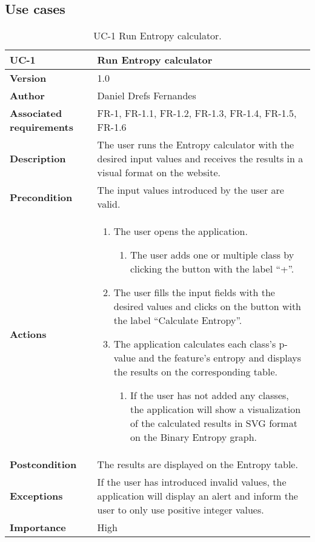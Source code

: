 \subsection{Use cases}
\begin{table}[p]
	\centering
	\begin{tabularx}{\linewidth}{ p{} p{} }
		\toprule
		\textbf{UC-1}    & \textbf{Run Entropy calculator}\\
		\toprule
		\textbf{Version}              & 1.0    \\
		\textbf{Author}                & Daniel Drefs Fernandes \\
		\textbf{Associated requirements} & FR-1, FR-1.1, FR-1.2, FR-1.3, FR-1.4, FR-1.5, FR-1.6 \\
		\textbf{Description}          & The user runs the Entropy calculator with the desired input values and receives the results in a visual format on the website. \\
		\textbf{Precondition}         & The input values introduced by the user are valid. \\
		\textbf{Actions}             &
		\begin{enumerate}
			\def\labelenumi{\arabic{enumi}.}
			\tightlist
			\item The user opens the application.
            \begin{enumerate}
                \item The user adds one or multiple class by clicking the button with the label ``+''.
            \end{enumerate}
			\item The user fills the input fields with the desired values and clicks on the button with the label ``Calculate Entropy''.
            \item The application calculates each class's p-value and the feature's entropy and displays the results on the corresponding table.
            \begin{enumerate}
                \item If the user has not added any classes, the application will show a visualization of the calculated results in SVG format on the Binary Entropy graph.
            \end{enumerate}
		\end{enumerate}\\
		\textbf{Postcondition}        & The results are displayed on the Entropy table. \\
		\textbf{Exceptions}          & If the user has introduced invalid values, the application will display an alert and inform the user to only use positive integer values. \\
		\textbf{Importance}          & High \\
		\bottomrule
	\end{tabularx}
	\caption{UC-1 Run Entropy calculator.}
\end{table}

